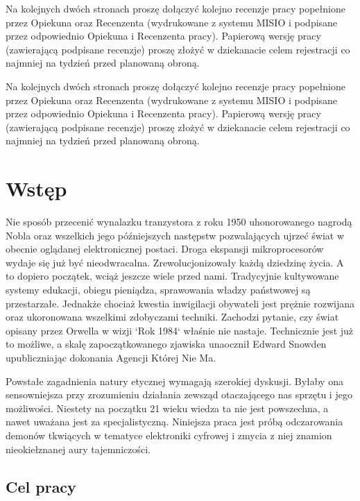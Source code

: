 \documentclass[a4paper,12pt]{article}
\begin{document}
\newpage
\noindent
Na kolejnych dwóch stronach proszę dołączyć kolejno recenzje pracy popełnione przez Opiekuna oraz Recenzenta (wydrukowane z systemu MISIO i podpisane przez odpowiednio Opiekuna i Recenzenta pracy). Papierową wersję pracy (zawierającą podpisane recenzje) proszę złożyć w dziekanacie celem rejestracji co najmniej na tydzień przed planowaną obroną.

\newpage
\noindent
Na kolejnych dwóch stronach proszę dołączyć kolejno recenzje pracy popełnione przez Opiekuna oraz Recenzenta (wydrukowane z systemu MISIO i podpisane przez odpowiednio Opiekuna i Recenzenta pracy). Papierową wersję pracy (zawierającą podpisane recenzje) proszę złożyć w dziekanacie celem rejestracji co najmniej na tydzień przed planowaną obroną.


\vspace{85mm}
\newpage
\tableofcontents

\newpage
\section{Wstęp}

Nie sposób przecenić wynalazku tranzystora z roku 1950 uhonorowanego nagrodą Nobla oraz wszelkich jego późniejszych następstw pozwalających ujrzeć świat w obecnie oglądanej elektronicznej postaci. Droga ekspansji mikroprocesorów wydaje się już być nieodwracalna. Zrewolucjonizowały każdą dziedzinę życia. A to dopiero początek, wciąż jeszcze wiele przed nami. Tradycyjnie kultywowane systemy edukacji, obiegu pieniądza, sprawowania władzy państwowej są przestarzałe. Jednakże chociaż kwestia inwigilacji obywateli jest prężnie rozwijana oraz ukoronowana wszelkimi zdobyczami techniki. Zachodzi pytanie, czy świat opisany przez Orwella w wizji `Rok 1984` właśnie nie nastaje. Technicznie jest już to możliwe, a skalę zapoczątkowanego zjawiska unaocznił Edward Snowden upubliczniając dokonania Agencji Której Nie Ma.

Powstałe zagadnienia natury etycznej wymagają szerokiej dyskusji. Byłaby ona sensowniejsza przy zrozumieniu działania zewsząd otaczającego nas sprzętu i jego możliwości. Niestety na początku 21 wieku wiedza ta nie jest powszechna, a nawet uważana jest za specjalistyczną. Niniejsza praca jest próbą odczarowania demonów tkwiących w tematyce elektroniki cyfrowej i zmycia z niej znamion nieokiełznanej aury tajemniczości.

\subsection{Cel pracy}
\end{document}
